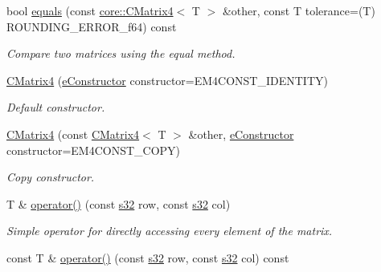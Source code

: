 \begin{DoxyCompactItemize}
bool \hyperlink{classirr_1_1core_1_1CMatrix4_abd3c6b6c69db075a70f65d3030113d3f}{equals} (const \hyperlink{classirr_1_1core_1_1CMatrix4}{core\+::\+C\+Matrix4}$<$ T $>$ \&other, const T tolerance=(T) R\+O\+U\+N\+D\+I\+N\+G\+\_\+\+E\+R\+R\+O\+R\+\_\+f64) const
\begin{DoxyCompactList}\small\item\em Compare two matrices using the equal method. \end{DoxyCompactList}\item 
\hyperlink{classirr_1_1core_1_1CMatrix4_af771bfde63cdaa3baa4d9f6121e56411}{C\+Matrix4} (\hyperlink{classirr_1_1core_1_1CMatrix4_a7bb79712227617f706ed57a34f3eb4fe}{e\+Constructor} constructor=E\+M4\+C\+O\+N\+S\+T\+\_\+\+I\+D\+E\+N\+T\+I\+TY)
\begin{DoxyCompactList}\small\item\em Default constructor. \end{DoxyCompactList}\item 
\hyperlink{classirr_1_1core_1_1CMatrix4_acdb7afc2248d97a7e882cd1bdeed07b7}{C\+Matrix4} (const \hyperlink{classirr_1_1core_1_1CMatrix4}{C\+Matrix4}$<$ T $>$ \&other, \hyperlink{classirr_1_1core_1_1CMatrix4_a7bb79712227617f706ed57a34f3eb4fe}{e\+Constructor} constructor=E\+M4\+C\+O\+N\+S\+T\+\_\+\+C\+O\+PY)
\begin{DoxyCompactList}\small\item\em Copy constructor. \end{DoxyCompactList}\item 
\mbox{\label{classirr_1_1core_1_1CMatrix4_aaede6824ed3ee05b928815d52e1834d1}} 
T \& \hyperlink{classirr_1_1core_1_1CMatrix4_aaede6824ed3ee05b928815d52e1834d1}{operator()} (const \hyperlink{namespaceirr_ac66849b7a6ed16e30ebede579f9b47c6}{s32} row, const \hyperlink{namespaceirr_ac66849b7a6ed16e30ebede579f9b47c6}{s32} col)
\begin{DoxyCompactList}\small\item\em Simple operator for directly accessing every element of the matrix. \end{DoxyCompactList}\item 
\mbox{\label{classirr_1_1core_1_1CMatrix4_ae46b8b6b47897f4bc8eee2d1c226cab8}} 
const T \& \hyperlink{classirr_1_1core_1_1CMatrix4_ae46b8b6b47897f4bc8eee2d1c226cab8}{operator()} (const \hyperlink{namespaceirr_ac66849b7a6ed16e30ebede579f9b47c6}{s32} row, const \hyperlink{namespaceirr_ac66849b7a6ed16e30ebede579f9b47c6}{s32} col) const

\end{DoxyCompactItemize}
